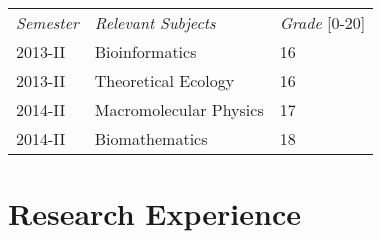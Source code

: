 \documentclass[margin,line]{res}
\begin{document}
\begin{resume}
\begin{center}
	\vspace{-9mm}
	\begin{tabular}{lll}
		\textit{Semester} & \textit{Relevant Subjects} & \textit{Grade} [0-20] \\
		2013-II & Bioinformatics & 16\\
		2013-II & Theoretical Ecology & 16\\
		2014-II & Macromolecular Physics & 17\\
		2014-II & Biomathematics & 18\\
	\end{tabular}
	\vspace{4mm}
\end{center}


\section{\sc Research Experience}


\end{resume}
\end{document}

